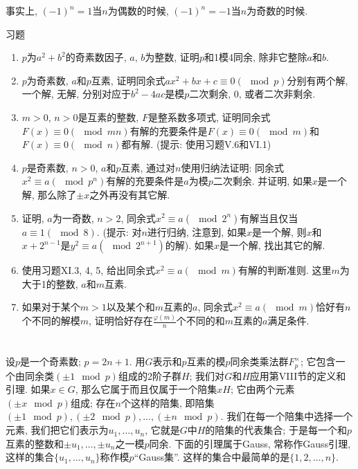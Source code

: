 \documentclass[12pt,a4paper]{book} %
\theoremstyle{remark}
\theoremstyle{example}
\theoremstyle{lemma}
\theoremstyle{corollary}
\numberwithin{theorem}{chapter}
\begin{document}
事实上, $(-1)^n = 1$当$n$为偶数的时候, $(-1)^n = -1$当$n$为奇数的时候.

习题

\begin{enumerate}
\item $p$为$a^2 + b^2$的奇素数因子, $a$, $b$为整数, 证明$p$和1模4同余, 除非它整除$a$和$b$.

\item $p$为奇素数, $a$和$p$互素, 证明同余式$ax^2 + bx + c \equiv 0 (\mod p)$分别有两个解, 一个解, 无解, 分别对应于$b^2 - 4ac$是模$p$二次剩余, 0, 或者二次非剩余.

\item $m > 0$, $n > 0$是互素的整数, $F$是整系数多项式, 证明同余式$F(x) \equiv 0 (\mod mn)$有解的充要条件是$F(x) \equiv 0 (\mod m)$和$F(x) \equiv 0 (\mod n)$都有解. (提示: 使用习题V.6和VI.1)

\item $p$是奇素数, $n > 0$, $a$和$p$互素, 通过对$n$使用归纳法证明: 同余式$x^2 \equiv a (\mod p^n)$有解的充要条件是$a$为模$p$二次剩余. 并证明, 如果$x$是一个解, 那么除了$\pm x$之外再没有其它解.

\item 证明, $a$为一奇数, $n > 2$, 同余式$x^2 \equiv a (\mod 2^n)$有解当且仅当$a \equiv 1 (\mod 8)$. (提示: 对$n$进行归纳, 注意到, 如果$x$是一个解, 则$x$和$x + 2^{n - 1}$是$y^2 \equiv a (\mod 2^{n+1})$的解). 如果$x$是一个解, 找出其它的解.

\item 使用习题XI.3, 4, 5, 给出同余式$x^2 \equiv a (\mod m)$有解的判断准则. 这里$m$为大于1的整数, $a$和$m$互素.

\item 如果对于某个$m > 1$以及某个和$m$互素的$a$, 同余式$x^2 \equiv a (\mod m)$恰好有$n$个不同的解模$m$, 证明恰好存在$\frac{\varphi(m)}{n}$个不同的和$m$互素的$a$满足条件.

\end{enumerate}

\chapter{} \label{chapter:12}
设$p$是一个奇素数; $p = 2n + 1$. 用$G$表示和$p$互素的模$p$同余类乘法群$F_{p}^{\times}$; 它包含一个由同余类$(\pm 1 \mod p)$组成的2阶子群$H$; 我们对$G$和$H$应用第VIII节的定义和引理. 如果$x \in G$, 那么它属于而且仅属于一个陪集$xH$; 它由两个元素$(\pm x \mod p)$组成; 存在$n$个这样的陪集, 即陪集$(\pm 1 \mod p), (\pm 2 \mod p), \ldots, (\pm n \mod p)$. 我们在每一个陪集中选择一个元素, 我们把它们表示为$u_1, \ldots, u_n$, 它就是$G$中$H$的陪集的代表集合; 于是每一个和$p$互素的整数和$\pm u_1, \ldots, \pm u_n$之一模$p$同余. 下面的引理属于Gauss, 常称作Gauss引理, 这样的集合$\{u_1, \ldots, u_n\}$称作模$p$``Gauss集''. 这样的集合中最简单的是$\{1, 2, \ldots, n\}$.
\end{document}
